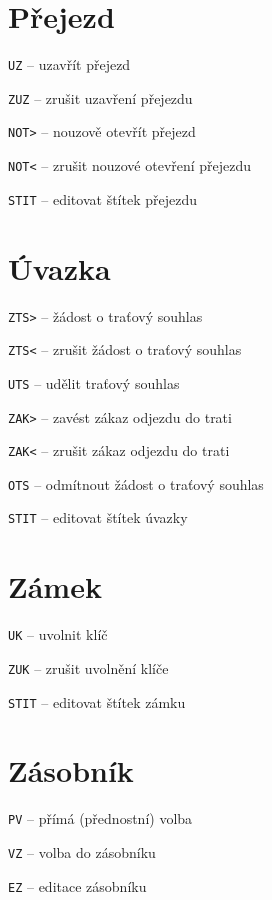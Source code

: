 \documentclass[12pt,a4paper,landscape]{article}
\begin{document}
\begin{multicols}{3}
\section{Přejezd}
\begin{compactitem}
	\item \texttt{UZ} -- uzavřít přejezd
	\item \texttt{ZUZ} -- zrušit uzavření přejezdu
	\item \texttt{NOT>} -- nouzově otevřít přejezd
	\item \texttt{NOT<} -- zrušit nouzové otevření přejezdu
	\item \texttt{STIT} -- editovat štítek přejezdu	
\end{compactitem}

\section{Úvazka}
\begin{compactitem}
	\item \texttt{ZTS>} -- žádost o traťový souhlas
	\item \texttt{ZTS<} -- zrušit žádost o traťový souhlas
	\item \texttt{UTS} -- udělit traťový souhlas
	\item \texttt{ZAK>} -- zavést zákaz odjezdu do trati
	\item \texttt{ZAK<} -- zrušit zákaz odjezdu do trati
	\item \texttt{OTS} -- odmítnout žádost o traťový souhlas
	\item \texttt{STIT} -- editovat štítek úvazky
\end{compactitem}

\section{Zámek}
\begin{compactitem}
	\item \texttt{UK} -- uvolnit klíč
	\item \texttt{ZUK} -- zrušit uvolnění klíče
	\item \texttt{STIT} -- editovat štítek zámku
\end{compactitem}

\section{Zásobník}
\begin{compactitem}
	\item \texttt{PV} -- přímá (přednostní) volba
	\item \texttt{VZ} -- volba do zásobníku
	\item \texttt{EZ} -- editace zásobníku
\end{compactitem}

\end{multicols}
\end{document}
